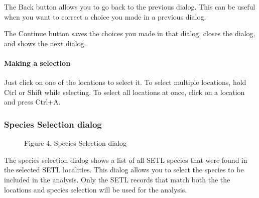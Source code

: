 \documentclass[letterpaper,10pt,english]{sphinxmanual}
\begin{document}
The Back button allows you to go back to the previous dialog. This can
be useful when you want to correct a choice you made in a previous
dialog.

The Continue button saves the choices you made in that dialog, closes
the dialog, and shows the next dialog.


\paragraph{Making a selection}
\label{user_manual:making-a-selection}
Just click on one of the locations to select it. To select multiple
locations, hold Ctrl or Shift while selecting. To select all locations
at once, click on a location and press Ctrl+A.


\subsubsection{Species Selection dialog}
\label{user_manual:dialog-spe-selection}\label{user_manual:species-selection-dialog}\begin{figure}[htbp]
\centering
\capstart

\caption{Figure 4. Species Selection dialog}\end{figure}

The species selection dialog shows a list of all SETL species that were
found in the selected SETL localities. This dialog allows you to select
the species to be included in the analysis. Only the SETL records that
match both the the locations and species selection will be used for the
analysis.
\end{document}
